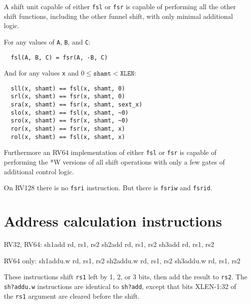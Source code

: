 



A shift unit capable of either {\tt fsl} or {\tt fsr} is capable of performing all
the other shift functions, including the other funnel shift, with only minimal additional
logic.

For any values of {\tt A}, {\tt B}, and {\tt C}:

\begin{minipage}{\linewidth}
\begin{verbatim}
  fsl(A, B, C) = fsr(A, -B, C)
\end{verbatim}
\end{minipage}

And for any values {\tt x} and $0 \le \texttt{shamt} < \texttt{XLEN}$:

\begin{minipage}{\linewidth}
\begin{verbatim}
  sll(x, shamt) == fsl(x, shamt, 0)
  srl(x, shamt) == fsr(x, shamt, 0)
  sra(x, shamt) == fsr(x, shamt, sext_x)
  slo(x, shamt) == fsl(x, shamt, ~0)
  sro(x, shamt) == fsr(x, shamt, ~0)
  ror(x, shamt) == fsr(x, shamt, x)
  rol(x, shamt) == fsl(x, shamt, x)
\end{verbatim}
\end{minipage}

Furthermore an RV64 implementation of either {\tt fsl} or {\tt fsr} is capable
of performing the *W versions of all shift operations with only a few gates
of additional control logic.

On RV128 there is no {\tt fsri} instruction. But there is {\tt fsriw} and {\tt fsrid}.


\section{Address calculation instructions}

\begin{rvb}
  RV32, RV64:
    sh1add rd, rs1, rs2
    sh2add rd, rs1, rs2
    sh3add rd, rs1, rs2

  RV64 only:
    sh1addu.w rd, rs1, rs2
    sh2addu.w rd, rs1, rs2
    sh3addu.w rd, rs1, rs2
\end{rvb}

These instructions shift {\tt rs1} left by 1, 2, or 3 bits, then add the result
to {\tt rs2}. The {\tt sh?addu.w} instructions are identical to {\tt sh?add}, except
that bits XLEN-1:32 of the {\tt rs1} argument are cleared before the shift.


